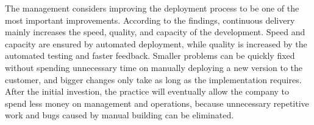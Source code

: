 \documentclass[lnbip]{svmultln}
\begin{document}
The management considers improving the deployment process to be one of the most important improvements. According to the findings, continuous delivery mainly increases the speed, quality, and capacity of the development. Speed and capacity are ensured by automated deployment, while quality is increased by the automated testing and faster feedback. Smaller problems can be quickly fixed without spending unnecessary time on manually deploying a new version to the customer, and bigger changes only take as long as the implementation requires. After the initial investion, the practice will eventually allow the company to spend less money on management and operations, because unnecessary repetitive work and bugs caused by manual building can be eliminated. %





\end{document}
